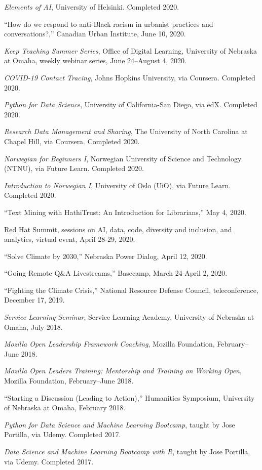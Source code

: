 \emph{Elements of AI}, University of Helsinki. Completed 2020.

``How do we respond to anti-Black racism in urbanist practices and
conversations?,'' Canadian Urban Institute, June 10, 2020.

\emph{Keep Teaching Summer Series}, Office of Digital Learning,
University of Nebraska at Omaha, weekly webinar series, June 24--August
4, 2020.

\emph{COVID-19 Contact Tracing}, Johns Hopkins University, via Coursera.
Completed 2020.

\emph{Python for Data Science}, University of California-San Diego, via
edX. Completed 2020.

\emph{Research Data Management and Sharing}, The University of North
Carolina at Chapel Hill, via Coursera. Completed 2020.

\emph{Norwegian for Beginners I}, Norwegian University of Science and
Technology (NTNU), via Future Learn. Completed 2020.

\emph{Introduction to Norwegian I}, University of Oslo (UiO), via Future
Learn. Completed 2020.

``Text Mining with HathiTrust: An Introduction for Librarians,'' May 4,
2020.

Red Hat Summit, sessions on AI, data, code, diversity and inclusion, and
analytics, virtual event, April 28-29, 2020.

``Solve Climate by 2030,'' Nebraska Power Dialog, April 12, 2020.

``Going Remote Q\&A Livestreams,'' Basecamp, March 24-April 2, 2020.

``Fighting the Climate Crisis,'' National Resource Defense Council,
teleconference, December 17, 2019.

\emph{Service Learning Seminar}, Service Learning Academy, University of
Nebraska at Omaha, July 2018.

\emph{Mozilla Open Leadership Framework Coaching}, Mozilla Foundation,
February--June 2018.

\emph{Mozilla Open Leaders Training: Mentorship and Training on Working
Open}, Mozilla Foundation, February--June 2018.

``Starting a Discussion (Leading to Action),'' Humanities Symposium,
University of Nebraska at Omaha, February 2018.

\emph{Python for Data Science and Machine Learning Bootcamp}, taught by
Jose Portilla, via Udemy. Completed 2017.

\emph{Data Science and Machine Learning Bootcamp with R}, taught by Jose
Portilla, via Udemy. Completed 2017.

